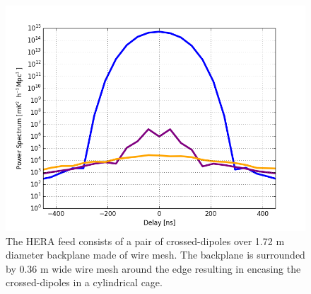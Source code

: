 \documentclass[twocolumn]{emulateapj}
\begin{document}
    \begin{figure}
    \centering
    \includegraphics[width=\linewidth]{GB_reflectometry_part3/plot/figure_cov_weight.png}
    \caption{The HERA feed consists of a pair of crossed-dipoles over 1.72 m diameter backplane made of wire mesh. The backplane is surrounded by 0.36 m wide wire mesh around the edge resulting in encasing the crossed-dipoles in a cylindrical cage.}
    \label{fig:cov_weight}
    \end{figure}
    
\end{document}
